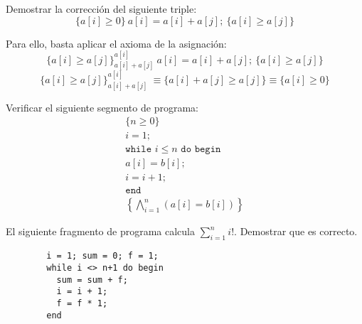 \begin{ejercicio}
    Demostrar la corrección del siguiente triple:
    \begin{equation*}
        \{a[i]\geq 0\}\ a[i]=a[i]+a[j];\ \{a[i]\geq a[j]\}
    \end{equation*}

    Para ello, basta aplicar el axioma de la asignación:
    \begin{equation*}
        \{a[i]\geq a[j]\}_{a[i]+a[j]}^{a[i]}\ a[i]=a[i]+a[j];\ \{a[i]\geq a[j]\}
    \end{equation*}
    \begin{equation*}
        \{a[i]\geq a[j]\}_{a[i]+a[j]}^{a[i]}\ \equiv \{a[i]+a[j]\geq a[j]\} \equiv \{a[i] \geq 0\}
    \end{equation*}
\end{ejercicio}

\begin{ejercicio}
    Verificar el siguiente segmento de programa:
    \begin{gather*}
        \{n\geq 0\}\\ 
        i = 1;\\
        \texttt{while\ } i\leq n \texttt{\ do\ begin}\\
        a[i] = b[i]; \\
        i=i+1;\\
        \texttt{end} \\
        \left\{\bigwedge_{i=1}^n (a[i]=b[i])\right\}
    \end{gather*}

\end{ejercicio}

\begin{ejercicio}
    El siguiente fragmento de programa calcula $\displaystyle\sum_{i=1}^{n} i!$. Demostrar que es correcto.
    \begin{verbatim}
        i = 1; sum = 0; f = 1;
        while i <> n+1 do begin
          sum = sum + f;
          i = i + 1;
          f = f * 1;
        end
    \end{verbatim}
\end{ejercicio}

